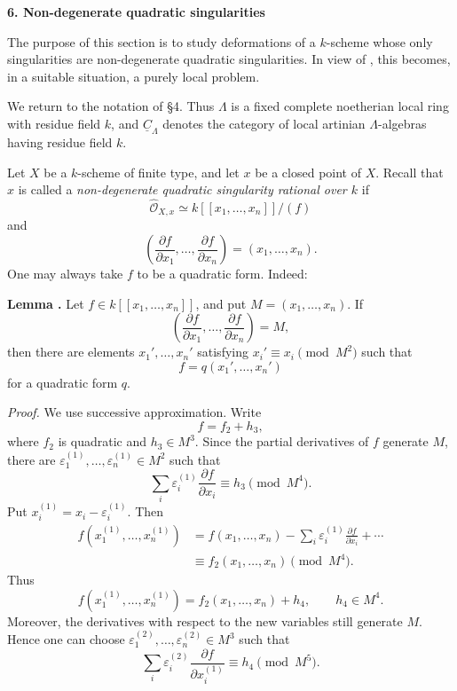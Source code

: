 \par\bigskip
\noindent\textbf{6. Non-degenerate quadratic singularities}

\medskip
The purpose of this section is to study deformations of a $k$-scheme
whose only singularities are non-degenerate quadratic singularities.
In view of , this becomes, in a suitable situation, a purely local
problem.

We return to the notation of \S4. Thus $\Lambda$ is a fixed complete
noetherian local ring with residue field $k$, and
$\underline C_\Lambda$ denotes the category of local artinian
$\Lambda$-algebras having residue field $k$.

Let $X$ be a $k$-scheme of finite type, and let $x$ be a closed point
of $X$. Recall that $x$ is called a \emph{non-degenerate quadratic
singularity rational over $k$} if
\[
\widehat{\mathcal O}_{X,x}
 \simeq k[[x_1,\ldots,x_n]]/(f)
\]
and
\[
\left(\frac{\partial f}{\partial x_1},\ldots,
      \frac{\partial f}{\partial x_n}\right)
=(x_1,\ldots,x_n).
\]
One may always take $f$ to be a quadratic form. Indeed:

\medskip
\noindent\textbf{Lemma .}
Let $f\in k[[x_1,\ldots,x_n]]$, and put
$M=(x_1,\ldots,x_n)$. If
\[
\left(\frac{\partial f}{\partial x_1},\ldots,
      \frac{\partial f}{\partial x_n}\right)=M,
\]
then there are elements $x_1',\ldots,x_n'$ satisfying
$x_i'\equiv x_i\pmod{M^2}$ such that
\[
f=q(x_1',\ldots,x_n')
\]
for a quadratic form $q$.

\smallskip
\noindent\textit{Proof.}
We use successive approximation. Write
\[
f=f_2+h_3,
\]
where $f_2$ is quadratic and $h_3\in M^3$. Since the partial
derivatives of $f$ generate $M$, there are
$\varepsilon_1^{(1)},\ldots,\varepsilon_n^{(1)}\in M^2$ such that
\[
\sum_i\varepsilon_i^{(1)}\frac{\partial f}{\partial x_i}
 \equiv h_3\pmod{M^4}.
\]
Put $x_i^{(1)}=x_i-\varepsilon_i^{(1)}$. Then
\[
\begin{aligned}
f(x_1^{(1)},\ldots,x_n^{(1)})
&=f(x_1,\ldots,x_n)
 -\sum_i\varepsilon_i^{(1)}\frac{\partial f}{\partial x_i}
 +\cdots\\
&\equiv f_2(x_1,\ldots,x_n)\pmod{M^4}.
\end{aligned}
\]
Thus
\[
f(x_1^{(1)},\ldots,x_n^{(1)})
=f_2(x_1,\ldots,x_n)+h_4,
\qquad h_4\in M^4.
\]
Moreover, the derivatives with respect to the new variables still
generate $M$. Hence one can choose
$\varepsilon_1^{(2)},\ldots,\varepsilon_n^{(2)}\in M^3$ such that
\[
\sum_i\varepsilon_i^{(2)}
 \frac{\partial f}{\partial x_i^{(1)}}
 \equiv h_4\pmod{M^5}.
\]


